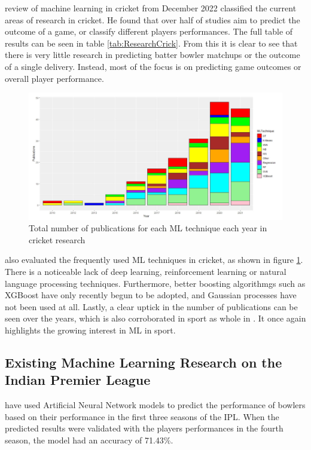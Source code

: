 \documentclass[12pt,a4paper]{report}
\theoremstyle{definition}
\begin{document}
\citet{Wickramasinghe2022} review of machine learning in cricket from December 2022 classified the current areas of research in cricket. 
He found that over half of studies aim to predict the outcome of a game, or classify different players performances. 
The full table of results can be seen in table \ref{tab:ResearchCrick}. 
From this it is clear to see that there is very little research in predicting batter bowler matchups or the outcome of a single delivery. 
Instead, most of the focus is on predicting game outcomes or overall player performance.

\begin{figure}[H]
    \centering
    \includegraphics[width=\linewidth]{ML_techniques_cricket.png}
    \caption{Total number of publications for each ML technique each year in cricket research \citep{Wickramasinghe2022}}
    \label{fig:NoPapersCricket}
\end{figure}

\citet{Wickramasinghe2022} also evaluated the frequently used ML techniques in cricket, as shown in figure \ref{fig:NoPapersCricket}. 
There is a noticeable lack of deep learning, reinforcement learning or natural language processing techniques.
Furthermore, better boosting algorithmgs such as XGBoost have only recently begun to be adopted, and Gaussian processes have not been used at all.
Lastly, a clear uptick in the number of publications can be seen over the years, which is also corroborated in sport as whole in \citet{horvat2020}.
It once again highlights the growing interest in ML in sport.

\subsection{Existing Machine Learning Research on the Indian Premier League}

\citet{Saikia2012} have used Artificial Neural Network models to predict the performance of bowlers based on their performance in the first three seasons of the IPL. 
When the predicted results were validated with the players performances in the fourth season, the model had an accuracy of 71.43\%.
\end{document}

